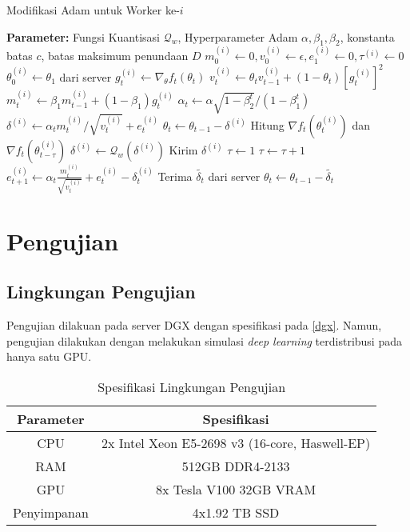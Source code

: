 \begin{algorithm}[H]
  \caption{Modifikasi Adam untuk Worker ke-$i$}\label{myadam_worker}
  \begin{algorithmic}[1]
    \State \textbf{Parameter:} Fungsi Kuantisasi $\mathcal{Q}_w$, Hyperparameter Adam $\alpha, \beta_1, \beta_2$, konstanta batas $c$, batas maksimum penundaan $D$
    \State $m_0^{(i)} \gets 0, v_0^{(i)} \gets \epsilon, e_1^{(i)} \gets 0, \tau^{(i)} \gets 0$
    \State $\theta^{(i)}_0 \gets \theta_1$ dari server
    \State $g_t^{(i)} \gets \nabla_\theta f_t(\theta_{t})$
    \State $v_t^{(i)} \gets \theta_t v_{t-1}^{(i)} + (1-\theta_t)[g_t^{(i)}]^2$
    \State $m_t^{(i)} \gets \beta_1 m_{t-1}^{(i)} + (1-\beta_1)g_t^{(i)}$
    \State $\alpha_t \gets \alpha \sqrt{1-\beta_2^t}/(1-\beta_1^t)$
    \State $\delta^{(i)} \gets \alpha_t m_t^{(i)}/\sqrt{v_t^{(i)}}+e_t^{(i)}$
    \State $\theta_t \gets \theta_{t-1} - \delta^{(i)}$
    \State Hitung $\nabla f_t(\theta^{(i)}_{t})$ dan $\nabla f_t(\theta^{(i)}_{t-\tau})$
    \State $\delta^{(i)} \gets \mathcal{Q}_w(\delta^{(i)})$
    \State Kirim $\delta^{(i)}$
    \State $\tau \gets 1$
    \Else
    \State $\tau \gets \tau + 1$
    \EndIf
    \State $e_{t+1}^{(i)} \gets \alpha_t \frac{m_t^{(i)}}{\sqrt{v_t^{(i)}}} + e_t^{(i)} - \delta_t^{(i)}$
    \State Terima $\tilde{\delta_t}$ dari server
    \State $\theta_{t} \gets \theta_{t-1} - \tilde{\delta_t}$
    \EndFor
  \end{algorithmic}
\end{algorithm}

\section{Pengujian}
\subsection{Lingkungan Pengujian}
Pengujian dilakuan pada server DGX dengan spesifikasi pada \autoref{dgx}. Namun, pengujian dilakukan dengan melakukan simulasi \emph{deep learning} terdistribusi pada hanya satu GPU.

\begin{table}[H]
  \caption{Spesifikasi Lingkungan Pengujian}\label{dgx}
  \centering
  \begin{tabular}{ | c | c | }
    \hline
    \textbf{Parameter} & \textbf{Spesifikasi}                           \\
    \hline
    CPU                & 2x Intel Xeon E5-2698 v3 (16-core, Haswell-EP) \\
    \hline
    RAM                & 512GB DDR4-2133                                \\
    \hline
    GPU                & 8x Tesla V100 32GB VRAM                        \\
    \hline
    Penyimpanan        & 4x1.92 TB SSD                                  \\
    \hline
  \end{tabular}
\end{table}

